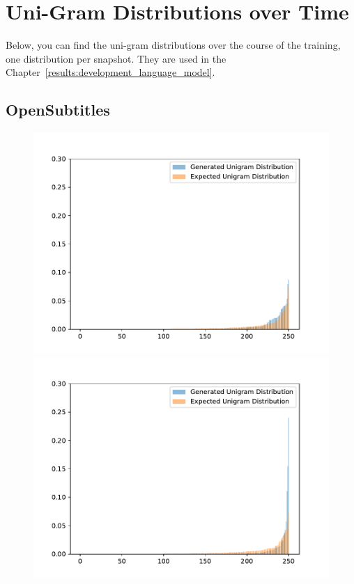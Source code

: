 \chapter{Uni-Gram Distributions over Time}

Below, you can find the uni-gram distributions over the course of the training, one distribution per snapshot. They are used in the Chapter~\ref{results:development_language_model}.

\section{OpenSubtitles}
\begin{figure}[H]
  \includegraphics[width=\linewidth]{img/plots/opensubtitles_not_reversed/unigram_distribution_comparison_step_500000.pdf}
  \centering
  \small
  \endminipage\hfill
  \includegraphics[width=\linewidth]{img/plots/opensubtitles_not_reversed/unigram_distribution_comparison_step_1000000.pdf}

\end{figure}
